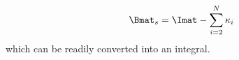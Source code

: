 \begin{equation}
  \Bmat_s = \Imat - \sum\limits^{N}_{i=2} \kappa_i
\end{equation}
which can be readily converted into an integral.